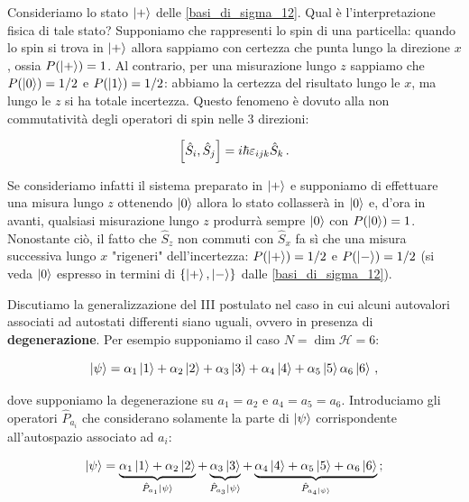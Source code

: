 \begin{esempio}
    Consideriamo lo stato $\ket{+}$ delle \eqref{basi_di_sigma_12}. Qual è l'interpretazione fisica di tale stato? Supponiamo che rappresenti lo spin di una particella: quando lo spin si trova in $\ket{+}$ allora sappiamo con certezza che punta lungo la direzione $x$, ossia $P(\ket{+}) = 1$. Al contrario, per una misurazione lungo $z$ sappiamo che $P(\ket{0}) = 1/2$ e $P(\ket{1}) = 1/2$: abbiamo la certezza del risultato lungo le $x$, ma lungo le $z$ si ha totale incertezza. Questo fenomeno è dovuto alla non commutatività degli operatori di spin nelle 3 direzioni:
    
    \begin{equation*}
        \comm{\hat{S}_i}{\hat{S}_j} = i \hbar \varepsilon_{ijk} \hat{S}_k \, .
    \end{equation*}
    
    \noindent Se consideriamo infatti il sistema preparato in $\ket{+}$ e supponiamo di effettuare una misura lungo $z$ ottenendo $\ket{0}$ allora lo stato collasserà in $\ket{0}$ e, d'ora in avanti, qualsiasi misurazione lungo $z$ produrrà sempre $\ket{0}$ con $P(\ket{0}) = 1$. Nonostante ciò, il fatto che $\hat{S}_z$ non commuti con $\hat{S}_x$ fa sì che una misura successiva lungo $x$ "rigeneri" dell'incertezza: $P(\ket{+}) = 1/2$ e $P(\ket{-}) = 1/2$ (si veda $\ket{0}$ espresso in termini di $\lbrace \ket{+}, \ket{-} \rbrace$ dalle \eqref{basi_di_sigma_12}). 
\end{esempio}

\noindent Discutiamo la generalizzazione del III postulato nel caso in cui alcuni autovalori associati ad autostati differenti siano uguali, ovvero in presenza di \textbf{degenerazione}. Per esempio supponiamo il caso $N = \dim \mathcal{H} = 6$: 

\begin{equation*}
    \ket \psi = \alpha_1 \ket 1 + \alpha_2 \ket 2 + \alpha_3 \ket 3 + \alpha_4 \ket 4 + \alpha_5 \ket 5 \alpha_6 \ket 6 \, , 
\end{equation*}

\noindent dove supponiamo la degenerazione su $a_1 = a_2$ e $a_4 = a_5 = a_6$. Introduciamo gli operatori $\hat{P}_{a_i}$ che considerano solamente la parte di $\ket{\psi}$ corrispondente all'autospazio associato ad $a_i$:

\begin{equation*}
    \ket \psi = \underbrace{\alpha_1 \ket 1 + \alpha_2 \ket 2 }_{\hat P_{a_1} \ket \psi} + \underbrace{\alpha_3 \ket 3}_{\hat P_{a_3} \ket \psi} + \underbrace{\alpha_4 \ket 4 + \alpha_5 \ket 5 + \alpha_6 \ket 6}_{\hat P_{a_4 \ket \psi}} \, ;
\end{equation*}

